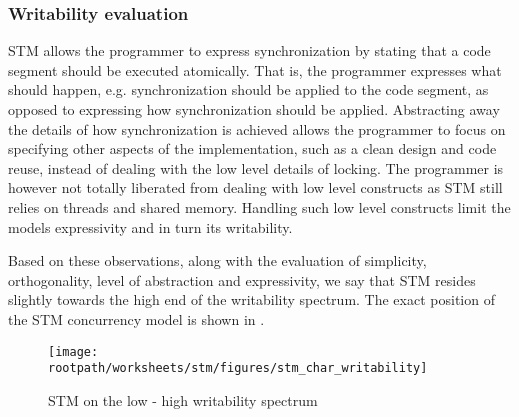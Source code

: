 \subsubsection{Writability evaluation}
\ac{STM} allows the programmer to express synchronization by stating that a code segment should be executed atomically. That is, the programmer expresses what should happen, e.g. synchronization should be applied to the code segment, as opposed to expressing how synchronization should be applied. Abstracting away the details of how synchronization is achieved allows the programmer to focus on specifying other aspects of the implementation, such as a clean design and code reuse, instead of dealing with the low level details of locking. The programmer is however not totally liberated from dealing with low level constructs as \ac{STM} still relies on threads and shared memory. Handling such low level constructs limit the models expressivity and in turn its writability.

Based on these observations, along with the evaluation of simplicity, orthogonality, level of abstraction and expressivity, we say that \ac{STM} resides slightly towards the high end of the writability spectrum. The exact position of the \ac{STM} concurrency model is shown in .

\begin{figure}[htbp]
\centering
 \texttt{[image: \\rootpath/worksheets/stm/figures/stm\_char\_writability]} 
 \caption{\ac{STM} on the low - high writability spectrum}
\label{fig:char_stm_writability}
\end{figure}

\worksheetend
